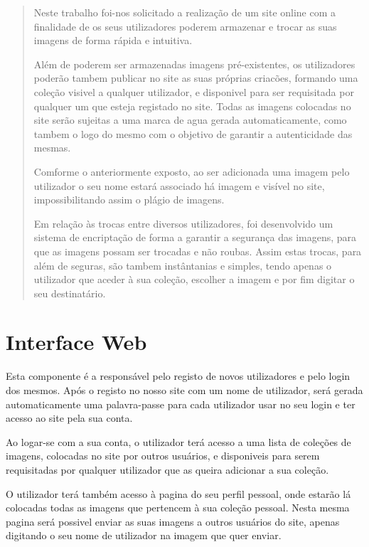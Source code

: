 \documentclass{report}
\begin{document}
\renewcommand{\abstractname}{OBJETIVOS DO PROJETO}
\begin{abstract}

Neste trabalho foi-nos solicitado a realização de um site online com a finalidade de os seus utilizadores poderem armazenar e trocar as suas imagens de forma rápida e intuitiva. 

Além de poderem ser armazenadas imagens pré-existentes, os utilizadores poderão tambem publicar no site as suas próprias criacões, formando uma coleção visivel a qualquer utilizador, e disponivel para ser requisitada por qualquer um que esteja registado no site.
Todas as imagens colocadas no site serão sujeitas a uma marca de agua gerada automaticamente, como tambem o logo do mesmo com o objetivo de garantir a autenticidade das mesmas.

Comforme o anteriormente exposto, ao ser adicionada uma imagem pelo utilizador o seu nome estará associado há imagem e visível no site, impossibilitando assim o plágio de imagens.

Em relação às trocas entre diversos utilizadores, foi desenvolvido um sistema de encriptação de forma a garantir a segurança das imagens, para que as imagens possam ser trocadas e não roubas. Assim estas trocas, para além de seguras, são tambem instântanias e simples, tendo apenas o utilizador que aceder à sua coleção, escolher a imagem e por fim digitar o seu destinatário.

\end{abstract}


\chapter{Interface Web}
Esta componente é a responsável pelo registo de novos utilizadores e pelo login dos mesmos. Após o registo no nosso site com um nome de utilizador, será gerada automaticamente uma palavra-passe para cada utilizador usar no seu login e ter acesso ao site pela sua conta.

Ao logar-se com a sua conta, o utilizador terá acesso a uma lista de coleções de imagens, colocadas no site por outros usuários, e disponiveis para serem requisitadas por qualquer utilizador que as queira adicionar a sua coleção. 

O utilizador terá também acesso à pagina do seu perfil pessoal, onde estarão lá colocadas todas as imagens que pertencem à sua coleção pessoal. Nesta mesma pagina será possivel enviar as suas imagens a outros usuários do site, apenas digitando o seu nome de utilizador na imagem que quer enviar. 
\end{document}
